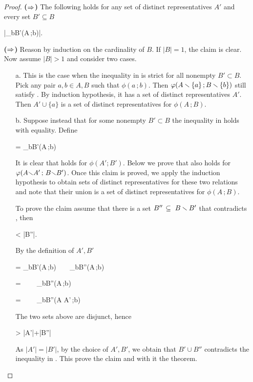 \documentclass[scombinatorics.tex]{subfiles}
\begin{document}
\begin{proof}
  \textbf{\boldmath($\Rightarrow$)}
  The following holds for any set of distinct representatives $A'$ and every set $B'\subseteq B$  

  {\subseteq}
  {\bigg|\bigcup_{b\in B'}\phi(A\,;b)\bigg|.}

  \textbf{\boldmath($\Rightarrow$)}
  Reason by induction on the cardinality of $B$.
  If $|B|=1$, the claim is clear.
  Now assume $|B|>1$ and consider two cases.

  \begin{itemize}
    \item[a.]
    This is the case when the inequality in  is strict for all nonempty $B'\subset B$. 
    Pick any pair $a,b\in A,B$ such that $\phi(a\,;b)$. 
    Then $\varphi(A\smallsetminus\{a\}\,; B\smallsetminus\{b\})$ still satisfy .
    By induction hypothesis, it has a set of distinct representatives $A'$.
    Then $A'\cup\{a\}$ is a set of distinct representatives for $\phi(A\,;B)$.

    
    \item[b.]
    Suppose instead that for some nonempty $B'\subset B$ the inequality in  holds with equality.
    Define

    {=}
    {\bigcup_{b\in B'}\phi(A\,;b)}
    
    It is clear that  holds for $\phi(A';B')$.
    Below we prove that  also holds for $\varphi(A{\smallsetminus} A'\,;\,{B\smallsetminus} B')$.
    Once this claim is proved, we apply the induction hypothesis to obtain sets of distinct representatives for these two relations and note that their union is a set of distinct representatives for $\phi(A\,;B)$.

    To prove the claim assume that there is a set $B''\,\subseteq\ B\smallsetminus B'$ that contradicts , then

    {<}
    {|B''|.}

    By the definition of $A',B'$

    {=}
    {\bigcup_{b\in B'}\phi(A\,;b)\ \ \cup\ \ \bigcup_{b\in B''}\phi(A\,;b)}

    \ceq{}
    {=}
    {\ \ \cup\ \ \bigcup_{b\in B''}\phi(A\,;b)}

    \ceq{}
    {=}
    {\ \ \cup\ \ \bigcup_{b\in B''}\phi(A{\sm} A'\,;b)}

    The two sets above are disjunct, hence 

    {>}
    {|A'|+|B''|}

    As $|A'|=|B'|$, by the choice of $A',B'$, we obtain that $B'\cup B''$ contradicts the inequality in .
    This prove the claim and with it the theorem.
  \end{itemize}\vspace*{-4ex}
\end{proof}
\end{document}
